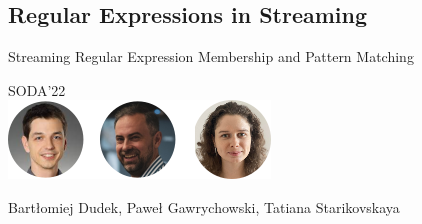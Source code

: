 \subsection{Regular Expressions in Streaming}
\begin{frame}
  \centering
  {\Large Streaming Regular Expression Membership and Pattern Matching}

  \bigskip
  {\large SODA'22}\\
  \bigskip
  \includegraphics{pictures/mindmap/regexp.png}

  \bigskip
  Bartłomiej Dudek, Paweł Gawrychowski, Tatiana Starikovskaya
\end{frame}

